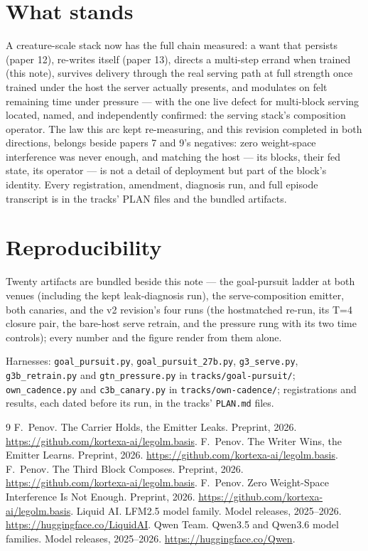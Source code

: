 \documentclass[11pt]{article}
\begin{document}
\section{What stands}

A creature-scale stack now has the full chain measured: a want that
persists (paper 12), re-writes itself (paper 13), directs a multi-step
errand when trained (this note), survives delivery through the real
serving path at full strength once trained under the host the server
actually presents, and modulates on felt remaining time under
pressure --- with the one live defect for multi-block serving located,
named, and independently confirmed: the serving stack's composition
operator. The law this arc kept re-measuring, and this revision
completed in both directions, belongs beside papers 7 and 9's
negatives: zero weight-space interference was never enough, and
matching the host --- its blocks, their fed state, its operator ---
is not a detail of deployment but part of the block's identity. Every
registration, amendment, diagnosis run, and full episode transcript
is in the tracks' PLAN files and the bundled artifacts.

\section{Reproducibility}

Twenty artifacts are bundled beside this note --- the goal-pursuit
ladder at both venues (including the kept leak-diagnosis run), the
serve-composition emitter, both canaries, and the v2 revision's four
runs (the hostmatched re-run, its T=4 closure pair, the bare-host
serve retrain, and the pressure rung with its two time controls);
every
number and the figure render from them alone. {\sloppy Harnesses:
\texttt{goal\_pursuit.py}, \texttt{goal\_pursuit\_27b.py},
\texttt{g3\_serve.py}, \texttt{g3b\_retrain.py} and
\texttt{gtn\_pressure.py} in \texttt{tracks/goal-pursuit/};
\texttt{own\_cadence.py} and \texttt{c3b\_canary.py} in
\texttt{tracks/own-cadence/}; registrations and results, each dated
before its run, in the tracks' \texttt{PLAN.md} files.\par}

\begin{thebibliography}{9}
 F.~Penov. The Carrier Holds, the Emitter
Leaks. Preprint, 2026.
\url{https://github.com/kortexa-ai/legolm.basis}.
 F.~Penov. The Writer Wins, the Emitter
Learns. Preprint, 2026.
\url{https://github.com/kortexa-ai/legolm.basis}.
 F.~Penov. The Third Block Composes.
Preprint, 2026. \url{https://github.com/kortexa-ai/legolm.basis}.
 F.~Penov. Zero Weight-Space
Interference Is Not Enough. Preprint, 2026.
\url{https://github.com/kortexa-ai/legolm.basis}.
 Liquid AI. LFM2.5 model family. Model releases,
2025--2026. \url{https://huggingface.co/LiquidAI}.
 Qwen Team. Qwen3.5 and Qwen3.6 model families.
Model releases, 2025--2026. \url{https://huggingface.co/Qwen}.
\end{thebibliography}
\end{document}
